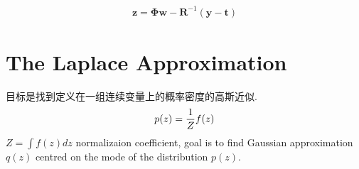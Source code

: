 \documentclass[a4paper]{article}
\begin{document}
\begin{align}
\mathbf{z} = \mathbf{\Phi} \mathbf{w} - \mathbf{R}^{-1}(\mathbf{y} - \mathbf{t})
\end{align}

\section{The Laplace Approximation}
\label{sec:4.4}
目标是找到定义在一组连续变量上的概率密度的高斯近似.
\begin{align}
  p(z) = {1 \over Z} f(z)
\end{align}
$Z = \int f(z)dz$ normalizaion coefficient, goal is to find Gaussian approximation $q(z)$ centred on the mode of the distribution $p(z)$.
\end{document}
